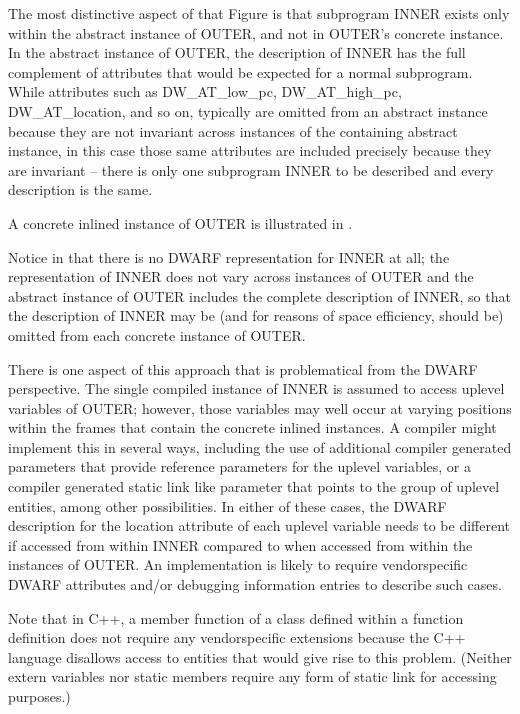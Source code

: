 The most distinctive aspect of that Figure is that subprogram
INNER exists only within the abstract instance of OUTER,
and not in OUTER’s concrete instance. In the abstract
instance of OUTER, the description of INNER has the full
complement of attributes that would be expected for a
normal subprogram. While attributes such as DW\-\_AT\-\_low\-\_pc,
DW\-\_AT\-\_high\-\_pc, DW\-\_AT\-\_location, and so on, typically are omitted
from an abstract instance because they are not invariant across
instances of the containing abstract instance, in this case
those same attributes are included precisely because they are
invariant -- there is only one subprogram INNER to be described
and every description is the same.

A concrete inlined instance of OUTER is illustrated in
.

Notice in 
that there is no DWARF representation for
INNER at all; the representation of INNER does not vary across
instances of OUTER and the abstract instance of OUTER includes
the complete description of INNER, so that the description of
INNER may be (and for reasons of space efficiency, should be)
omitted from each concrete instance of OUTER.

There is one aspect of this approach that is problematical from
the DWARF perspective. The single compiled instance of INNER
is assumed to access up\dash level variables of OUTER; however,
those variables may well occur at varying positions within
the frames that contain the concrete inlined instances. A
compiler might implement this in several ways, including the
use of additional compiler generated parameters that provide
reference parameters for the up\dash level variables, or a compiler
generated static link like parameter that points to the group
of up\dash level entities, among other possibilities. In either of
these cases, the DWARF description for the location attribute
of each uplevel variable needs to be different if accessed
from within INNER compared to when accessed from within the
instances of OUTER. An implementation is likely to require
vendor\dash specific DWARF attributes and/or debugging information
entries to describe such cases.

Note that in C++, a member function of a class defined within
a function definition does not require any vendor\dash specific
extensions because the C++ language disallows access to
entities that would give rise to this problem. (Neither extern
variables nor static members require any form of static link
for accessing purposes.)

